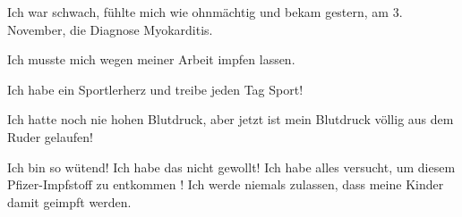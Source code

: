 Ich war schwach, fühlte mich wie ohnmächtig und bekam gestern, am 3. November,
die Diagnose Myokarditis.

Ich musste mich wegen meiner Arbeit impfen lassen.

Ich habe ein Sportlerherz und treibe jeden Tag Sport!

Ich hatte noch nie hohen Blutdruck, aber jetzt ist mein Blutdruck völlig aus dem
Ruder gelaufen!

Ich bin so wütend! Ich habe das nicht gewollt! Ich habe alles versucht, um
diesem Pfizer-Impfstoff zu entkommen ! Ich werde niemals zulassen, dass meine
Kinder damit geimpft werden.
